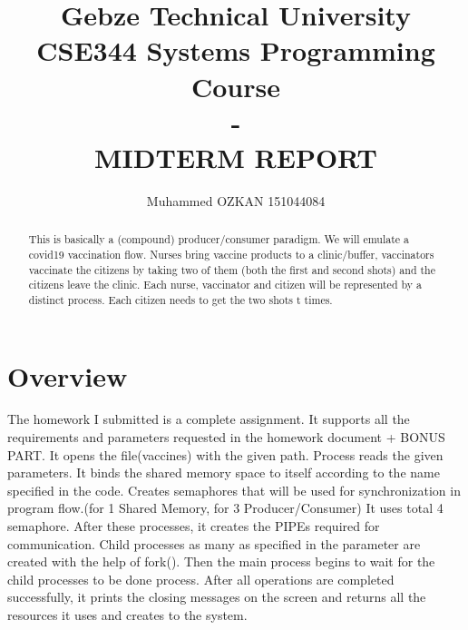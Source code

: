 \documentclass{article}
\begin{document}
\title{Gebze Technical University\\CSE344 Systems Programming Course\\ -\\MIDTERM REPORT}
\author{Muhammed OZKAN 151044084}

\maketitle

\begin{abstract}
This is basically a (compound) producer/consumer paradigm. We will emulate a covid19 vaccination flow. Nurses bring vaccine products to a clinic/buffer, vaccinators vaccinate the citizens by taking two of them (both the first and second shots) and the citizens leave the clinic. Each nurse, vaccinator and citizen will be represented by a distinct process. Each citizen needs to get the two shots t times. 
\end{abstract}

\section{Overview}
\quad The homework I submitted is a complete assignment. It supports all the requirements and parameters requested in the homework document + BONUS PART. It opens the file(vaccines) with the given path. Process reads the given parameters. It binds the shared memory space to itself according to the name specified in the code. Creates semaphores that will be used for synchronization in program flow.(for 1 Shared Memory, for 3 Producer/Consumer) It uses total 4 semaphore. After these processes, it creates the PIPEs required for communication. Child processes as many as specified in the parameter are created with the help of fork(). Then the main process begins to wait for the child processes to be done  process. After all operations are completed successfully, it prints the closing messages on the screen and returns all the resources it uses and creates to the system.\\
\newpage
\end{document}
